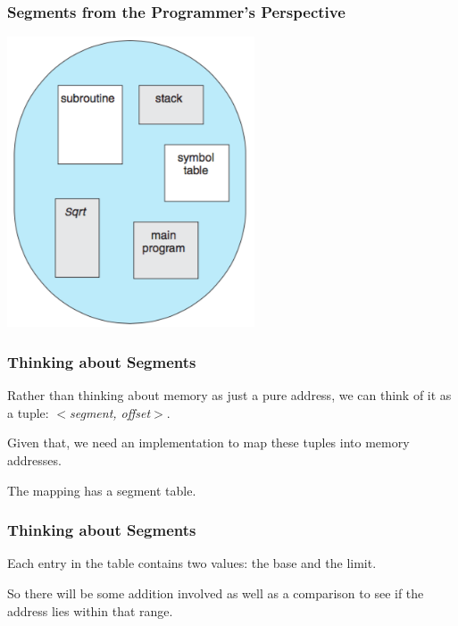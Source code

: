 \begin{frame}
\frametitle{Segments from the Programmer's Perspective}

\begin{center}
\includegraphics[width=0.55\textwidth]{images/segments.png}
\end{center}


\end{frame}

\begin{frame}
\frametitle{Thinking about Segments}

Rather than thinking about memory as just a pure address, we can think of it as a tuple: \textit{$<$segment, offset$>$}. 

Given that, we need an implementation to map these tuples into memory addresses. 

The mapping has a segment table.

\end{frame}

\begin{frame}
\frametitle{Thinking about Segments}

Each entry in the table contains two values: the base and the limit.

So there will be some addition involved as well as a comparison to see if the address lies within that range.

\end{frame}

